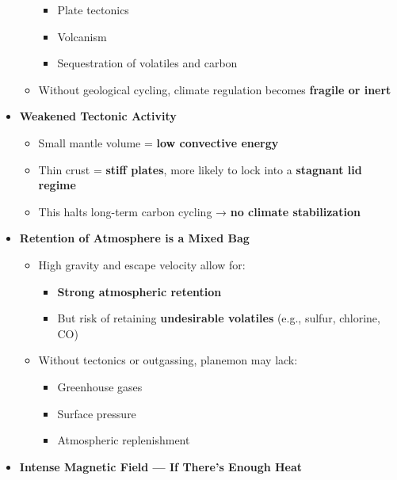 \documentclass[
  letterpaper,
]{book}
\providecommand{\tightlist}{%
  \setlength{\itemsep}{0pt}\setlength{\parskip}{0pt}}
\begin{document}
\begin{itemize}
\begin{itemize}
    \begin{itemize}
    \tightlist
    \item
      Plate tectonics
    \item
      Volcanism
    \item
      Sequestration of volatiles and carbon
    \end{itemize}
  \item
    Without geological cycling, climate regulation becomes
    \textbf{fragile or inert}
  \end{itemize}
\item
  \textbf{Weakened Tectonic Activity}

  \begin{itemize}
  \tightlist
  \item
    Small mantle volume = \textbf{low convective energy}\\
  \item
    Thin crust = \textbf{stiff plates}, more likely to lock into a
    \textbf{stagnant lid regime}\\
  \item
    This halts long-term carbon cycling → \textbf{no climate
    stabilization}
  \end{itemize}
\item
  \textbf{Retention of Atmosphere is a Mixed Bag}

  \begin{itemize}
  \tightlist
  \item
    High gravity and escape velocity allow for:

    \begin{itemize}
    \tightlist
    \item
      \textbf{Strong atmospheric retention}\\
    \item
      But risk of retaining \textbf{undesirable volatiles} (e.g.,
      sulfur, chlorine, CO)
    \end{itemize}
  \item
    Without tectonics or outgassing, planemon may lack:

    \begin{itemize}
    \tightlist
    \item
      Greenhouse gases\\
    \item
      Surface pressure\\
    \item
      Atmospheric replenishment
    \end{itemize}
  \end{itemize}
\item
  \textbf{Intense Magnetic Field --- If There's Enough Heat}


\end{itemize}
\end{document}

